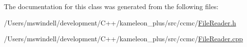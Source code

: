 The documentation for this class was generated from the following files\-:\begin{DoxyCompactItemize}
\item 
/\-Users/mswindell/development/\-C++/kameleon\-\_\-plus/src/ccmc/\hyperlink{_file_reader_8h}{File\-Reader.\-h}\item 
/\-Users/mswindell/development/\-C++/kameleon\-\_\-plus/src/ccmc/\hyperlink{_file_reader_8cpp}{File\-Reader.\-cpp}\end{DoxyCompactItemize}
